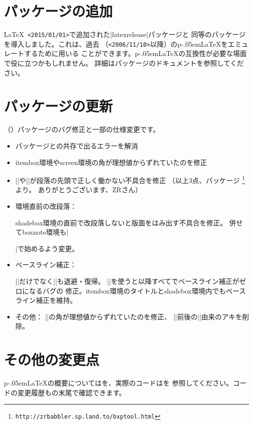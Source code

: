 \documentclass{plnews}
\def\pLaTeX{p\kern-.05em\LaTeX}
\begin{document}
\section{パッケージの追加}
\LaTeX\ \texttt{<2015/01/01>}で追加された|latexrelease|パッケージと
同等のパッケージを導入しました。これは、過去
（\texttt{<2006/11/10>}以降）の\pLaTeX{}をエミュレートするために用いる
ことができます。\pLaTeX{}の互換性が必要な場面で役に立つかもしれません。
詳細はパッケージのドキュメントを参照してください。


\section{パッケージの更新}
（）パッケージのバグ修正と一部の仕様変更です。

\begin{itemize}
\item {}パッケージとの共存で出るエラーを解消
\item itembox環境やscreen環境の角が理想値からずれていたのを修正
\item |\maskbox|や|\Maskbox|が段落の先頭で正しく働かない不具合を修正
      （以上3点、パッケージ%
        \footnote{\texttt{http://zrbabbler.sp.land.to/bxptool.html}}より。
        ありがとうございます、ZRさん）
\item 環境直前の改段落：\par
      shadebox環境の直前で改段落しないと版面をはみ出す不具合を修正。
      併せてboxnote環境も|\par\vspace{.3\baselineskip}|で始めるよう変更。
\item ベースライン補正：\par
      |\tbaselineshift|だけでなく|\ybaselineshift|も退避・復帰。
      ||を使うと以降すべてでベースライン補正がゼロになるバグの
      修正。itembox環境のタイトルとshadebox環境内でもベースライン補正を維持。
\item その他：
      |\keytop|の角が理想値からずれていたのを修正、
      ||前後の|\xkanjiskip|由来のアキを削除。
\end{itemize}


\section{その他の変更点}
\pLaTeX{}の概要についてはを、実際のコードはを
参照してください。コードの変更履歴もの末尾で確認できます。
\end{document}
